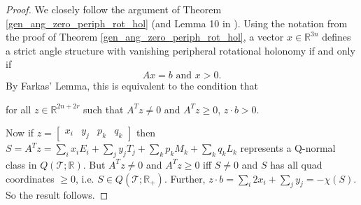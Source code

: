 \documentclass[12pt,reqno]{amsart}  %
\theoremstyle{definition}
\theoremstyle{remark}
\def\R{\mathbb{R}}
\newcommand{\T}{\mathcal{T}}
\begin{document}
\begin{proof}
We closely follow the argument of Theorem \ref{gen_ang_zero_periph_rot_hol} 
(and Lemma 10 in \cite{LT}). Using the notation from the proof of 
Theorem \ref{gen_ang_zero_periph_rot_hol},  
a vector $x \in \R^{3n}$ defines a strict angle structure with vanishing 
peripheral rotational holonomy if and only if 
$$Ax=b \text{ and } x>0.$$ 
By Farkas' Lemma, this is equivalent to the condition that
\begin{center}
for all $z\in \R^{2n+2r}$ such that $A^Tz \neq 0$ and $A^Tz\geq0$, $z\cdot b>0$. 
\end{center}
Now if
$z= \begin{bmatrix} x_i & y_j &p_k &q_k\end{bmatrix}$ 
then $S=A^Tz = \sum_i x_i E_i + \sum_j y_j T_j + \sum_k p_k M_k 
+ \sum_k q_k L_k$ represents a Q-normal class in  $Q(\T;\R)$. 
But $A^Tz \neq 0$ and $A^Tz\geq0$ iff $S \ne 0$ and $S$ has all quad 
coordinates $\ge 0$, i.e. $S \in Q(\T;\R_+)$.
Further, $z\cdot b = \sum_i 2 x_i + \sum_j  y_j = -\chi(S)$. So the 
result follows.
\end{proof}




\end{document}
